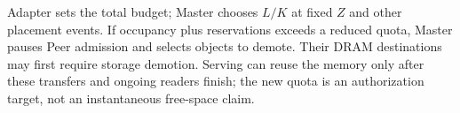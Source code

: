 Adapter sets the total budget; Master chooses $L/K$ at fixed $Z$ and
other placement events. If occupancy plus reservations exceeds a reduced
quota, Master pauses Peer admission and selects objects to demote. Their
DRAM destinations may first require storage demotion. Serving can reuse
the memory only after these transfers and ongoing readers finish; the
new quota is an authorization target, not an instantaneous free-space claim.
